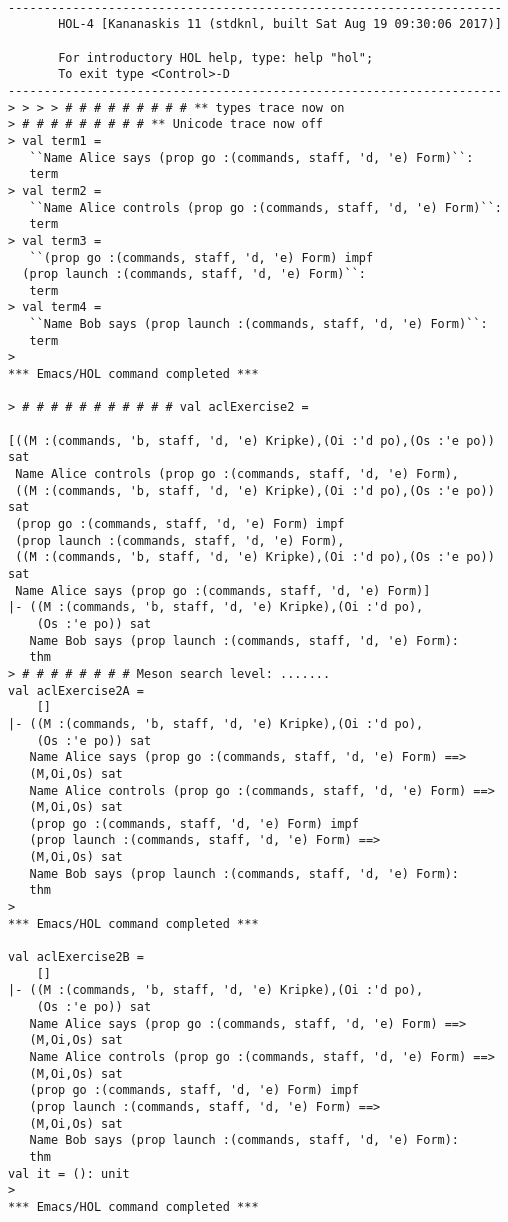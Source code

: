 \documentclass{report}
\begin{document}
\setcounter{sessioncount}{0}
\begin{session}
  \begin{scriptsize}
\begin{verbatim}

---------------------------------------------------------------------
       HOL-4 [Kananaskis 11 (stdknl, built Sat Aug 19 09:30:06 2017)]

       For introductory HOL help, type: help "hol";
       To exit type <Control>-D
---------------------------------------------------------------------
> > > > # # # # # # # # # ** types trace now on
> # # # # # # # # # ** Unicode trace now off
> val term1 =
   ``Name Alice says (prop go :(commands, staff, 'd, 'e) Form)``:
   term
> val term2 =
   ``Name Alice controls (prop go :(commands, staff, 'd, 'e) Form)``:
   term
> val term3 =
   ``(prop go :(commands, staff, 'd, 'e) Form) impf
  (prop launch :(commands, staff, 'd, 'e) Form)``:
   term
> val term4 =
   ``Name Bob says (prop launch :(commands, staff, 'd, 'e) Form)``:
   term
> 
*** Emacs/HOL command completed ***

> # # # # # # # # # # # val aclExercise2 =
   
[((M :(commands, 'b, staff, 'd, 'e) Kripke),(Oi :'d po),(Os :'e po)) sat
 Name Alice controls (prop go :(commands, staff, 'd, 'e) Form),
 ((M :(commands, 'b, staff, 'd, 'e) Kripke),(Oi :'d po),(Os :'e po)) sat
 (prop go :(commands, staff, 'd, 'e) Form) impf
 (prop launch :(commands, staff, 'd, 'e) Form),
 ((M :(commands, 'b, staff, 'd, 'e) Kripke),(Oi :'d po),(Os :'e po)) sat
 Name Alice says (prop go :(commands, staff, 'd, 'e) Form)]
|- ((M :(commands, 'b, staff, 'd, 'e) Kripke),(Oi :'d po),
    (Os :'e po)) sat
   Name Bob says (prop launch :(commands, staff, 'd, 'e) Form):
   thm
> # # # # # # # # Meson search level: .......
val aclExercise2A =
    []
|- ((M :(commands, 'b, staff, 'd, 'e) Kripke),(Oi :'d po),
    (Os :'e po)) sat
   Name Alice says (prop go :(commands, staff, 'd, 'e) Form) ==>
   (M,Oi,Os) sat
   Name Alice controls (prop go :(commands, staff, 'd, 'e) Form) ==>
   (M,Oi,Os) sat
   (prop go :(commands, staff, 'd, 'e) Form) impf
   (prop launch :(commands, staff, 'd, 'e) Form) ==>
   (M,Oi,Os) sat
   Name Bob says (prop launch :(commands, staff, 'd, 'e) Form):
   thm
> 
*** Emacs/HOL command completed ***

val aclExercise2B =
    []
|- ((M :(commands, 'b, staff, 'd, 'e) Kripke),(Oi :'d po),
    (Os :'e po)) sat
   Name Alice says (prop go :(commands, staff, 'd, 'e) Form) ==>
   (M,Oi,Os) sat
   Name Alice controls (prop go :(commands, staff, 'd, 'e) Form) ==>
   (M,Oi,Os) sat
   (prop go :(commands, staff, 'd, 'e) Form) impf
   (prop launch :(commands, staff, 'd, 'e) Form) ==>
   (M,Oi,Os) sat
   Name Bob says (prop launch :(commands, staff, 'd, 'e) Form):
   thm
val it = (): unit
> 
*** Emacs/HOL command completed ***
\end{verbatim}
  \end{scriptsize}
\end{session}
\end{document}
